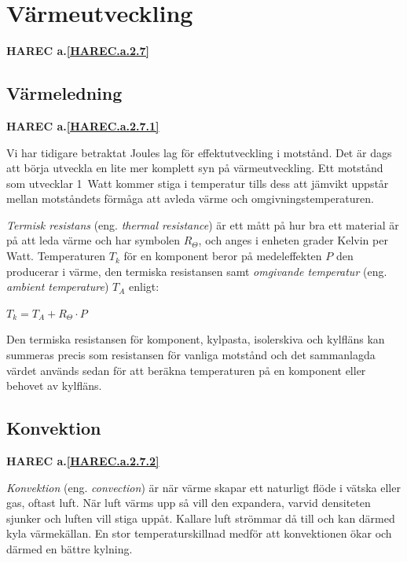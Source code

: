 \section{Värmeutveckling}

\textbf{
HAREC a.\ref{HAREC.a.2.7}\label{myHAREC.a.2.7}
}


\subsection{Värmeledning}

\textbf{
HAREC a.\ref{HAREC.a.2.7.1}\label{myHAREC.a.2.7.1}
}


Vi har tidigare betraktat Joules lag för effektutveckling i motstånd.
Det är dags att börja utveckla en lite mer komplett syn på värmeutveckling.
Ett motstånd som utvecklar 1~Watt kommer stiga i temperatur tills dess att
jämvikt uppstår mellan motståndets förmåga att avleda värme och
omgivningstemperaturen.

\emph{Termisk resistans} (eng. \emph{thermal resistance}) är ett mått på
hur bra ett material är på att leda värme och har symbolen \(R_\Theta\),
och anges i enheten grader Kelvin per Watt. Temperaturen \(T_k\) för en
komponent beror på medeleffekten \(P\) den producerar i värme, den
termiska resistansen samt \emph{omgivande temperatur} (eng. 
\emph{ambient temperature}) \(T_A\) enligt:

\(T_k = T_A + R_\Theta \cdot P\)

Den termiska resistansen för komponent, kylpasta, isolerskiva och kylfläns
kan summeras precis som resistansen för vanliga motstånd och det
sammanlagda värdet används sedan för att beräkna temperaturen på en
komponent eller behovet av kylfläns.

\subsection{Konvektion}
\textbf{
HAREC a.\ref{HAREC.a.2.7.2}\label{myHAREC.a.2.7.2}
}

\emph{Konvektion} (eng. \emph{convection}) är när värme skapar ett
naturligt flöde i vätska eller gas, oftast luft. När luft värms upp så
vill den expandera, varvid densiteten sjunker och luften vill stiga uppåt.
Kallare luft strömmar då till och kan därmed kyla värmekällan. En stor
temperaturskillnad medför att konvektionen ökar och därmed en bättre
kylning.

